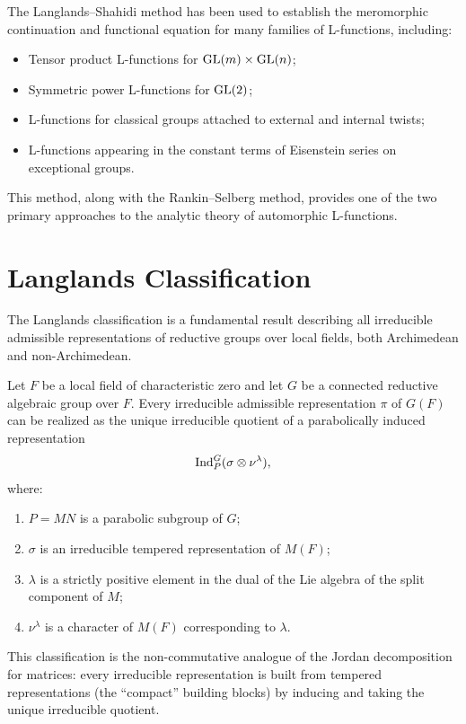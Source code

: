 The Langlands--Shahidi method has been used to establish the meromorphic continuation and functional equation for many families of L-functions, including:
\begin{itemize}
\item Tensor product L-functions for \(\operatorname{GL}(m) \times \operatorname{GL}(n)\);
\item Symmetric power L-functions for \(\operatorname{GL}(2)\);
\item L-functions for classical groups attached to external and internal twists;
\item L-functions appearing in the constant terms of Eisenstein series on exceptional groups.
\end{itemize}

This method, along with the Rankin--Selberg method, provides one of the two primary approaches to the analytic theory of automorphic L-functions.

\section{Langlands Classification}

The Langlands classification is a fundamental result describing all irreducible admissible representations of reductive groups over local fields, both Archimedean and non-Archimedean.

\begin{theorem}
Let \(F\) be a local field of characteristic zero and let \(G\) be a connected reductive algebraic group over \(F\). Every irreducible admissible representation \(\pi\) of \(G(F)\) can be realized as the unique irreducible quotient of a parabolically induced representation
\[
\operatorname{Ind}_{P}^{G} (\sigma \otimes \nu^{\lambda}),
\]
where:
\begin{enumerate}
\item \(P = MN\) is a parabolic subgroup of \(G\);
\item \(\sigma\) is an irreducible tempered representation of \(M(F)\);
\item \(\lambda\) is a strictly positive element in the dual of the Lie algebra of the split component of \(M\);
\item \(\nu^{\lambda}\) is a character of \(M(F)\) corresponding to \(\lambda\).
\end{enumerate}
\end{theorem}

This classification is the non-commutative analogue of the Jordan decomposition for matrices: every irreducible representation is built from tempered representations (the ``compact'' building blocks) by inducing and taking the unique irreducible quotient.

